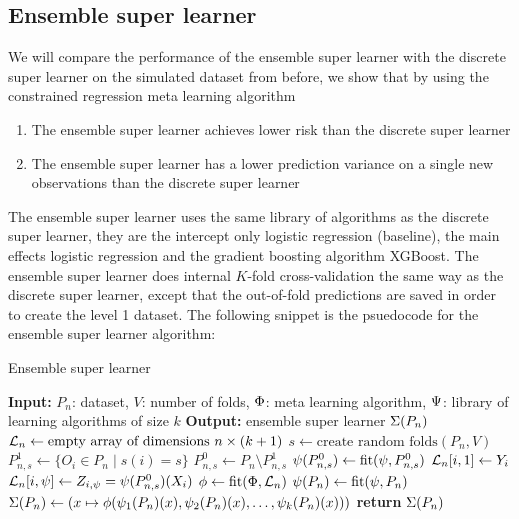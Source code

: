 \documentclass[./main.tex]{subfiles}
\begin{document}
\subsection{Ensemble super learner}
We will compare the performance of the ensemble super learner with the discrete super learner on the simulated dataset from before, we show that by using the constrained regression meta learning algorithm
\begin{enumerate}
    \item The ensemble super learner achieves lower risk than the discrete super learner
    \item The ensemble super learner has a lower prediction variance on a single new observations than the discrete super learner
\end{enumerate}
The ensemble super learner uses the same library of algorithms as the discrete super learner, they are the intercept only logistic regression (baseline), the main effects logistic regression and the gradient boosting algorithm XGBoost. The ensemble super learner does internal $ K $-fold cross-validation the same way as the discrete super learner, except that the out-of-fold predictions are saved in order to create the level 1 dataset. The following snippet is the psuedocode for the ensemble super learner algorithm:
\begin{algorithm}[H]
\caption{Ensemble super learner}
\begin{algorithmic}[1]
\State \textbf{Input:} $P_n$: dataset, $V$: number of folds, $ \Phi $: meta learning algorithm, $ \Psi $: library of learning algorithms of size $ k $
\State \textbf{Output:} ensemble super learner $ \Sigma(P_n) $
\State $\mathcal{L}_n \gets \text{empty array of dimensions } n \times (k+1)$  
\State $s \gets \text{create random folds}(P_n, V)$ 
    \State $P_{n, s}^{1} \gets \{O_i \in P_n \mid s(i) = s\} $
    \State $P_{n, s}^{0} \gets P_n \setminus P_{n,s}^{1} $
    \For{$\la \in \lib$}
        \State $ \psi(P_{n,s}^{0}) \gets \text{fit}(\psi, P_{n, s}^{0})$
            \State $ \mathcal{L}_n[i, 1] \gets Y_i $ 
            \State $ \mathcal{L}_n[i, \psi] \gets Z_{i, \psi} = \psi(P_{n,s}^{0})(X_i) $ 
        \EndFor
    \EndFor
\EndFor
\State $ \phi \gets \text{fit}(\Phi, \mathcal{L}_n) $ 
\For{$\la \in \lib$}
    \State $ \psi(P_{n}) \gets \text{fit}(\psi, P_{n})$ 
\EndFor
\State $ \Sigma(P_n) \gets (x \mapsto \phi(\psi_1(P_n)(x), \psi_2(P_n)(x), \dots , \psi_{k}(P_n)(x))) $ 
\State \textbf{return} $ \Sigma(P_n) $
\end{algorithmic}
\end{algorithm}
\end{document}
